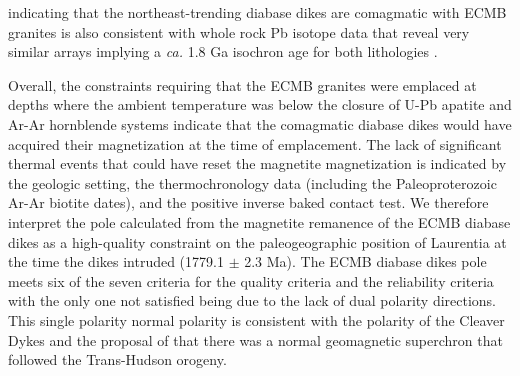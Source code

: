 \documentclass[draft]{agujournal2019}
\begin{document}
indicating that the northeast-trending diabase dikes are comagmatic with ECMB granites is also consistent with whole rock Pb isotope data that reveal very similar arrays implying a \textit{ca.} 1.8 Ga isochron age for both lithologies \cite{Horan1987a}. 


Overall, the constraints requiring that the ECMB granites were emplaced at depths where the ambient temperature was below the closure of U-Pb apatite and Ar-Ar hornblende systems indicate that the comagmatic diabase dikes would have acquired their magnetization at the time of emplacement. The lack of significant thermal events that could have reset the magnetite magnetization is indicated by the geologic setting, the thermochronology data (including the Paleoproterozoic Ar-Ar biotite dates), and the positive inverse baked contact test. We therefore interpret the pole calculated from the magnetite remanence of the ECMB diabase dikes as a high-quality constraint on the paleogeographic position of Laurentia at the time the dikes intruded (1779.1 $\pm$ 2.3 Ma). The ECMB diabase dikes pole meets six of the seven criteria for the quality criteria  and the  reliability criteria with the only one not satisfied being due to the lack of dual polarity directions. This single polarity normal polarity is consistent with the polarity of the Cleaver Dykes and the proposal of  that there was a normal geomagnetic superchron that followed the Trans-Hudson orogeny.
\end{document}
